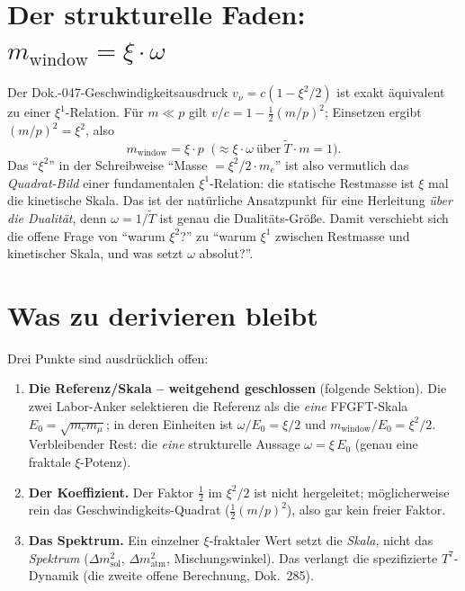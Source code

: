 \section{Der strukturelle Faden: $m_{\text{window}}=\xi\cdot\omega$}
Der Dok.-047-Geschwindigkeitsausdruck $v_\nu=c(1-\xi^2/2)$ ist exakt äquivalent zu einer
$\xi^1$-Relation. Für $m\ll p$ gilt $v/c=1-\tfrac12(m/p)^2$; Einsetzen ergibt $(m/p)^2=\xi^2$, also
\begin{equation}
m_{\text{window}}=\xi\cdot p\;\;\big(\approx \xi\cdot\omega\ \text{über}\ \tilde T\cdot m=1\big).
\end{equation}
Das \enquote{$\xi^2$} in der Schreibweise \enquote{Masse $=\xi^2/2\cdot m_e$} ist also vermutlich
das \emph{Quadrat-Bild} einer fundamentalen $\xi^1$-Relation: die statische Restmasse ist $\xi$ mal
die kinetische Skala. Das ist der natürliche Ansatzpunkt für eine Herleitung \emph{über die
Dualität}, denn $\omega=1/\tilde T$ ist genau die Dualitäts-Größe. Damit verschiebt sich die offene
Frage von \enquote{warum $\xi^2$?} zu \enquote{warum $\xi^1$ zwischen Restmasse und kinetischer
Skala, und was setzt $\omega$ absolut?}.

\section{Was zu derivieren bleibt}
Drei Punkte sind ausdrücklich offen:
\begin{enumerate}
  \item \textbf{Die Referenz/Skala -- weitgehend geschlossen} (folgende Sektion). Die zwei
  Labor-Anker selektieren die Referenz als die \emph{eine} FFGFT-Skala $E_0=\sqrt{m_e m_\mu}$; in
  deren Einheiten ist $\omega/E_0=\xi/2$ und $m_{\text{window}}/E_0=\xi^2/2$. Verbleibender Rest: die
  \emph{eine} strukturelle Aussage $\omega=\xi\,E_0$ (genau eine fraktale $\xi$-Potenz).
  \item \textbf{Der Koeffizient.} Der Faktor $\tfrac12$ im $\xi^2/2$ ist nicht hergeleitet;
  möglicherweise rein das Geschwindigkeits-Quadrat ($\tfrac12(m/p)^2$), also gar kein freier Faktor.
  \item \textbf{Das Spektrum.} Ein einzelner $\xi$-fraktaler Wert setzt die \emph{Skala}, nicht das
  \emph{Spektrum} ($\Delta m^2_{\text{sol}}$, $\Delta m^2_{\text{atm}}$, Mischungswinkel). Das
  verlangt die spezifizierte $T^7$-Dynamik (die zweite offene Berechnung, Dok.~285).
\end{enumerate}

